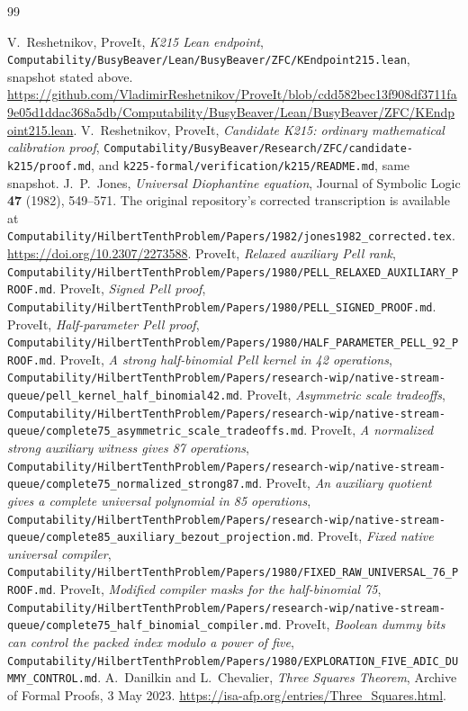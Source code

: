 \documentclass[11pt,a4paper]{article}
\theoremstyle{definition}
\theoremstyle{remark}
\newcommand{\pathref}[1]{\nolinkurl{#1}}
\begin{document}
\clearpage
\begin{thebibliography}{99}
\raggedright
{}
V.~Reshetnikov, ProveIt, \emph{K215 Lean endpoint},
\pathref{Computability/BusyBeaver/Lean/BusyBeaver/ZFC/KEndpoint215.lean},
snapshot stated above.
\url{https://github.com/VladimirReshetnikov/ProveIt/blob/cdd582bec13f908df3711fa9e05d1ddac368a5db/Computability/BusyBeaver/Lean/BusyBeaver/ZFC/KEndpoint215.lean}.
V.~Reshetnikov, ProveIt, \emph{Candidate K215: ordinary mathematical
calibration proof}, \pathref{Computability/BusyBeaver/Research/ZFC/candidate-k215/proof.md},
and \pathref{k225-formal/verification/k215/README.md}, same snapshot.
J.~P.~Jones, \emph{Universal Diophantine equation},
Journal of Symbolic Logic \textbf{47} (1982), 549--571.
The original repository's corrected transcription is available at
\pathref{Computability/HilbertTenthProblem/Papers/1982/jones1982_corrected.tex}.
\url{https://doi.org/10.2307/2273588}.
ProveIt, \emph{Relaxed auxiliary Pell rank},
\pathref{Computability/HilbertTenthProblem/Papers/1980/PELL_RELAXED_AUXILIARY_PROOF.md}.
ProveIt, \emph{Signed Pell proof},
\pathref{Computability/HilbertTenthProblem/Papers/1980/PELL_SIGNED_PROOF.md}.
ProveIt, \emph{Half-parameter Pell proof},
\pathref{Computability/HilbertTenthProblem/Papers/1980/HALF_PARAMETER_PELL_92_PROOF.md}.
ProveIt, \emph{A strong half-binomial Pell kernel in 42 operations},
\pathref{Computability/HilbertTenthProblem/Papers/research-wip/native-stream-queue/pell_kernel_half_binomial42.md}.
ProveIt, \emph{Asymmetric scale tradeoffs},
\pathref{Computability/HilbertTenthProblem/Papers/research-wip/native-stream-queue/complete75_asymmetric_scale_tradeoffs.md}.
ProveIt, \emph{A normalized strong auxiliary witness gives 87 operations},
\pathref{Computability/HilbertTenthProblem/Papers/research-wip/native-stream-queue/complete75_normalized_strong87.md}.
ProveIt, \emph{An auxiliary quotient gives a complete universal
polynomial in 85 operations},
\pathref{Computability/HilbertTenthProblem/Papers/research-wip/native-stream-queue/complete85_auxiliary_bezout_projection.md}.
ProveIt, \emph{Fixed native universal compiler},
\pathref{Computability/HilbertTenthProblem/Papers/1980/FIXED_RAW_UNIVERSAL_76_PROOF.md}.
ProveIt, \emph{Modified compiler masks for the half-binomial 75},
\pathref{Computability/HilbertTenthProblem/Papers/research-wip/native-stream-queue/complete75_half_binomial_compiler.md}.
ProveIt, \emph{Boolean dummy bits can control the packed index
modulo a power of five},
\pathref{Computability/HilbertTenthProblem/Papers/1980/EXPLORATION_FIVE_ADIC_DUMMY_CONTROL.md}.
A.~Danilkin and L.~Chevalier, \emph{Three Squares Theorem},
Archive of Formal Proofs, 3 May 2023.
\url{https://isa-afp.org/entries/Three_Squares.html}.
\end{thebibliography}
\end{document}
